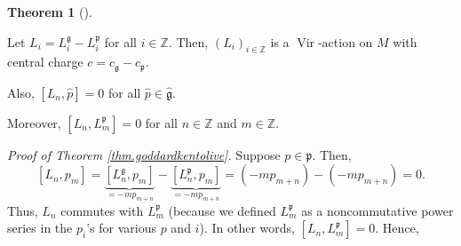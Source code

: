 \documentclass
[numbers=enddot,12pt,final,onecolumn,german,notitlepage]{scrartcl}%
\theoremstyle{definition}
\newtheorem{theo}{Theorem}
\newenvironment{theorem}[1][]
{\begin{theo}[#1]\begin{leftbar}}
{\end{leftbar}\end{theo}}
\begin{document}
\begin{theorem}
\label{thm.goddardkentolive}Let $L_{i}=L_{i}^{\mathfrak{g}}-L_{i}%
^{\mathfrak{p}}$ for all $i\in\mathbb{Z}$. Then, $\left(  L_{i}\right)
_{i\in\mathbb{Z}}$ is a $\operatorname*{Vir}$-action on $M$ with central
charge $c=c_{\mathfrak{g}}-c_{\mathfrak{p}}$.

Also, $\left[  L_{n},\widehat{p}\right]  =0$ for all $\widehat{p}%
\in\widehat{\mathfrak{g}}$.

Moreover, $\left[  L_{n},L_{m}^{\mathfrak{p}}\right]  =0$ for all
$n\in\mathbb{Z}$ and $m\in\mathbb{Z}$.
\end{theorem}

\textit{Proof of Theorem \ref{thm.goddardkentolive}.} Suppose $p\in
\mathfrak{p}$. Then,%
\[
\left[  L_{n},p_{m}\right]  =\underbrace{\left[  L_{n}^{\mathfrak{g}}%
,p_{m}\right]  }_{=-mp_{m+n}}-\underbrace{\left[  L_{n}^{\mathfrak{p}}%
,p_{m}\right]  }_{=-mp_{m+n}}=\left(  -mp_{m+n}\right)  -\left(
-mp_{m+n}\right)  =0.
\]
Thus, $L_{n}$ commutes with $L_{m}^{\mathfrak{p}}$ (because we defined
$L_{m}^{\mathfrak{p}}$ as a noncommutative power series in the $p_{i}$'s for
various $p$ and $i$). In other words, $\left[  L_{n},L_{m}^{\mathfrak{p}%
}\right]  =0$. Hence,
\end{document}
